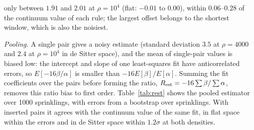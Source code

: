 \documentclass[prd,twocolumn,superscriptaddress,nofootinbib,amsmath,amssymb,floatfix]{revtex4-2}
\makeatletter
\providecommand{\DIFaddtex}[1]{{\protect\color{blue}\uwave{#1}}} %
\providecommand{\DIFdeltex}[1]{{\protect\color{red}\sout{#1}}} %
\providecommand{\DIFaddbegin}{} %
\providecommand{\DIFaddend}{} %
\providecommand{\DIFdelbegin}{} %
\providecommand{\DIFdelend}{} %
\providecommand{\DIFadd}[1]{\texorpdfstring{\DIFaddtex{#1}}{#1}} %
\providecommand{\DIFdel}[1]{\texorpdfstring{\DIFdeltex{#1}}{}} %
\providecommand{\DIFscaledelfig}{0.5}
\newlength{\DIFdelgraphicswidth} %
\newlength{\DIFdelgraphicsheight} %
\providecommand{\DIFaddincludegraphics}[2][]{{\color{blue}\fbox{\DIFOincludegraphics[#1]{#2}}}} %
\providecommand{\DIFdelincludegraphics}[2][]{%
\sbox{\DIFdelgraphicsbox}{\DIFOincludegraphics[#1]{#2}}%
\settoboxwidth{\DIFdelgraphicswidth}{\DIFdelgraphicsbox} %
\settoboxtotalheight{\DIFdelgraphicsheight}{\DIFdelgraphicsbox} %
\scalebox{\DIFscaledelfig}{%
\parbox[b]{\DIFdelgraphicswidth}{\usebox{\DIFdelgraphicsbox}\\[-\baselineskip] \rule{\DIFdelgraphicswidth}{0em}}\llap{\resizebox{\DIFdelgraphicswidth}{\DIFdelgraphicsheight}{%
\setlength{\unitlength}{\DIFdelgraphicswidth}%
\begin{picture}(1,1)%
\thicklines\linethickness{2pt} %
{\color[rgb]{1,0,0}\put(0,0){\framebox(1,1){}}}%
{\color[rgb]{1,0,0}\put(0,0){\line( 1,1){1}}}%
{\color[rgb]{1,0,0}\put(0,1){\line(1,-1){1}}}%
\end{picture}%
}\hspace*{3pt}}} %
} %
\DeclareRobustCommand{\DIFaddbegin}{\DIFOaddbegin \let\includegraphics\DIFaddincludegraphics} %
\DeclareRobustCommand{\DIFaddend}{\DIFOaddend \let\includegraphics\DIFOincludegraphics} %
\DeclareRobustCommand{\DIFdelbegin}{\DIFOdelbegin \let\includegraphics\DIFdelincludegraphics} %
\DeclareRobustCommand{\DIFdelend}{\DIFOaddend \let\includegraphics\DIFOincludegraphics} %
\let\sout@orig\sout %
\renewcommand{\sout}[1]{\ifmmode\text{\sout@orig{\ensuremath{#1}}}\else\sout@orig{#1}\fi} %
\makeatother
\begin{document}
only between $1.91$ and $2.01$ at $\rho=10^4$ (flat: $-0.01$ to $0.00$), within $0.06$--$0.28$ of the continuum value of each rule; the largest offset belongs to the shortest window, which is also the noisiest.

\emph{Pooling.} A single pair gives a noisy estimate (standard deviation $3.5$ at $\rho=4000$ and $2.4$ at $\rho=10^4$ in de Sitter space), and the mean of single-pair values is biased low: the intercept and slope of one least-squares fit have anticorrelated errors, so $E[-16\beta/\alpha]$ is smaller than $-16E[\beta]/E[\alpha]$. Summing the fit coefficients over the pairs before forming the ratio, $R_{\rm est}=-16\sum\beta/\sum\alpha$, removes this ratio bias to first order. Table~\ref{tab:rest} shows the pooled estimator over 1000 sprinklings, with errors from a bootstrap over sprinklings. With inserted pairs it agrees with the continuum value of the same fit, in flat space within the errors and in de Sitter space within \DIFdelbegin \DIFdel{$1.2\sigma$ }\DIFdelend \DIFaddbegin \DIFadd{$1.1\sigma$ }\DIFaddend at both densities.
\end{document}
